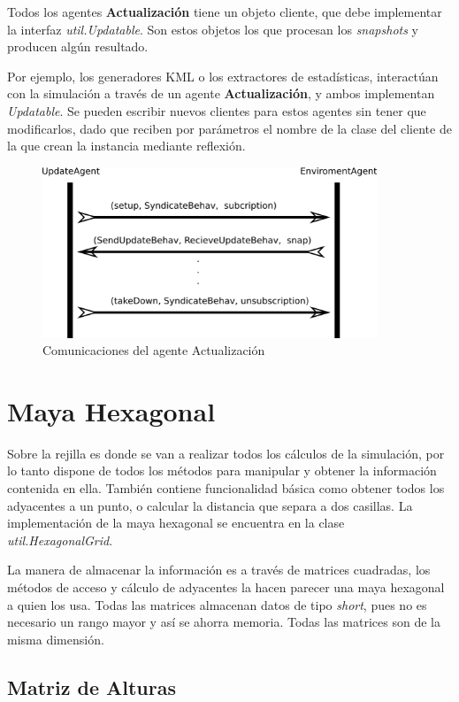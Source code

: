 Todos los agentes {\bf Actualización} tiene un objeto cliente, que debe
implementar la interfaz {\em util.Updatable}. Son estos objetos los que
procesan los {\em snapshots} y producen algún resultado.

Por ejemplo, los generadores KML o los extractores de estadísticas, interactúan
con la simulación a través de un agente {\bf Actualización}, y ambos
implementan {\em Updatable}. Se pueden escribir nuevos clientes para estos
agentes sin tener que modificarlos, dado que reciben por parámetros el nombre
de la clase del cliente de la que crean la instancia mediante reflexión.

\begin{figure}[H]
 \centering
 \includegraphics[width=100mm]{figuras/cap5/com_update.png}
 \caption{Comunicaciones del agente Actualización}
\end{figure}

\section{Maya Hexagonal}

Sobre la rejilla es donde se van a realizar todos los cálculos de la simulación,
por lo tanto dispone de todos los métodos para manipular y obtener la
información contenida en ella. También contiene funcionalidad básica como
obtener todos los adyacentes a un punto, o calcular la distancia que separa a
dos casillas. La implementación de la maya hexagonal se encuentra en la clase
{\em util.HexagonalGrid}.

La manera de almacenar la información es a través de matrices cuadradas, los
métodos de acceso y cálculo de adyacentes la hacen parecer una maya hexagonal a
quien los usa. Todas las matrices almacenan datos de tipo {\em short}, pues no
es necesario un rango mayor y así se ahorra memoria. Todas las matrices son de
la misma dimensión.

\subsection{Matriz de Alturas}

